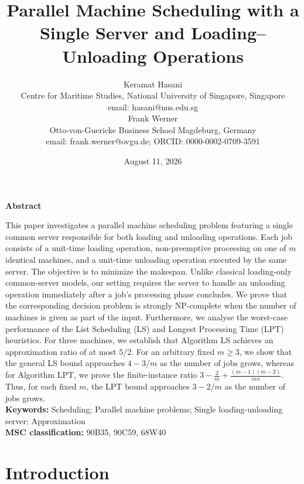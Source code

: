 \documentclass[11pt]{article}
\title{Parallel Machine Scheduling with a Single Server and Loading--Unloading Operations}
\author{%
Keramat Hasani  \\[1ex]
Centre for Maritime Studies, National University of Singapore, Singapore  \\[1ex]
email: hasani@nus.edu.sg  \\[3ex]
  Frank Werner  \\[1ex]
Otto-von-Guericke Business School Magdeburg, Germany \\[1ex]
  email: frank.werner@ovgu.de; ORCID: 0000-0002-0709-3591
}
\date{August 11, 2026}
\begin{document}
\maketitle


\begin{center}
\textbf{Abstract}
\end{center}

This paper investigates a parallel machine scheduling problem featuring a single common server responsible for both loading and unloading operations. Each job consists of a unit-time loading operation, non-preemptive processing on one of \(m\) identical machines, and a unit-time unloading operation executed by the same server. The objective is to minimize the makespan. Unlike classical loading-only common-server models, our setting requires the server to handle an unloading operation immediately after a job's processing phase concludes. We prove that the corresponding decision problem is strongly NP-complete when the number of machines is given as part of the input. Furthermore, we analyse the worst-case performance of the List Scheduling (LS) and Longest Processing Time (LPT) heuristics. For three machines, we establish that Algorithm LS achieves an approximation ratio of at most \(5/2\). For an arbitrary fixed \(m \ge 3\), we show that the general LS bound approaches \(4-3/m\) as the number of jobs grows, whereas for Algorithm LPT, we prove the finite-instance ratio
$3-\frac{2}{m}+\frac{(m-1)(m-2)}{mn}.$ Thus, for each fixed \(m\), the LPT bound approaches \(3-2/m\) as the number of jobs grows.\\[1ex]

\noindent
{\bf Keywords:} Scheduling; Parallel machine problems; Single loading-unloading server; Approximation  \\[1ex]

\noindent
{\bf MSC classification:}  90B35, 90C59, 68W40
\section{Introduction}
\label{sec:introduction}
\end{document}
